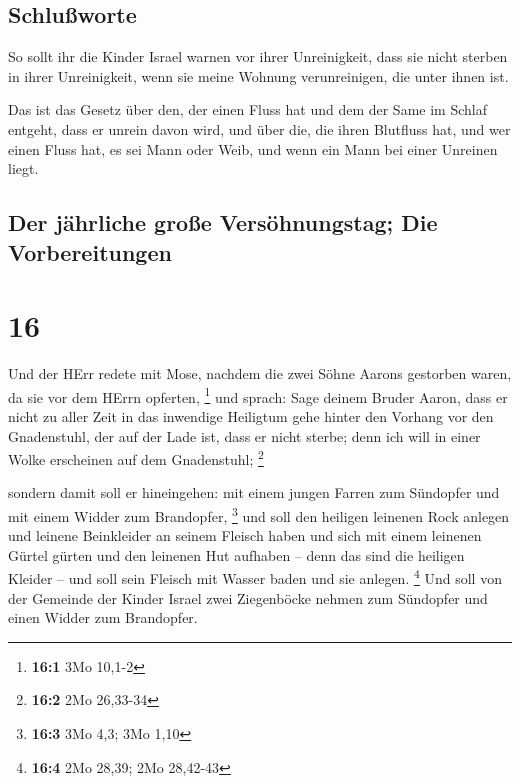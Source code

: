 \hypertarget{schluuxdfworte}{%
\subsection{Schlußworte}\label{schluuxdfworte}}

 So sollt ihr die Kinder Israel warnen vor ihrer
Unreinigkeit, dass sie nicht sterben in ihrer Unreinigkeit, wenn sie
meine Wohnung verunreinigen, die unter ihnen ist.

 Das ist das Gesetz über den, der einen Fluss hat und dem
der Same im Schlaf entgeht, dass er unrein davon wird, 
und über die, die ihren Blutfluss hat, und wer einen Fluss hat, es sei
Mann oder Weib, und wenn ein Mann bei einer Unreinen liegt.

\hypertarget{der-juxe4hrliche-grouxdfe-versuxf6hnungstag-die-vorbereitungen}{%
\subsection{Der jährliche große Versöhnungstag; Die
Vorbereitungen}\label{der-juxe4hrliche-grouxdfe-versuxf6hnungstag-die-vorbereitungen}}

\hypertarget{section-15}{%
\section{16}\label{section-15}}

 Und der HErr redete mit Mose, nachdem die zwei Söhne
Aarons gestorben waren, da sie vor dem HErrn opferten, \footnote{\textbf{16:1}
  3Mo 10,1-2}  und sprach: Sage deinem Bruder Aaron, dass
er nicht zu aller Zeit in das inwendige Heiligtum gehe hinter den
Vorhang vor den Gnadenstuhl, der auf der Lade ist, dass er nicht sterbe;
denn ich will in einer Wolke erscheinen auf dem Gnadenstuhl; \footnote{\textbf{16:2}
  2Mo 26,33-34}

 sondern damit soll er hineingehen: mit einem jungen
Farren zum Sündopfer und mit einem Widder zum Brandopfer, \footnote{\textbf{16:3}
  3Mo 4,3; 3Mo 1,10}  und soll den heiligen leinenen Rock
anlegen und leinene Beinkleider an seinem Fleisch haben und sich mit
einem leinenen Gürtel gürten und den leinenen Hut aufhaben -- denn das
sind die heiligen Kleider -- und soll sein Fleisch mit Wasser baden und
sie anlegen. \footnote{\textbf{16:4} 2Mo 28,39; 2Mo 28,42-43}
 Und soll von der Gemeinde der Kinder Israel zwei
Ziegenböcke nehmen zum Sündopfer und einen Widder zum Brandopfer.

